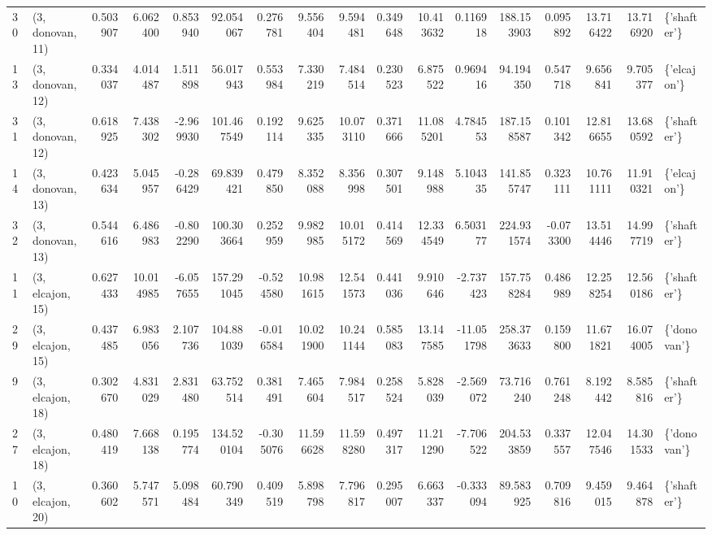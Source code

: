 \begin{tabular}{llrrrrrrrrrrrrrrl}
30 &  (3, donovan, 11) &   0.503907 &   6.062400 &  0.853940 &   92.054067 &  0.276781 &   9.556404 &   9.594481 &  0.349648 &  10.413632 &   0.116918 &  188.153903 &  0.095892 &  13.716422 &  13.716920 &  \{'shafter'\} \\
13 &  (3, donovan, 12) &   0.334037 &   4.014487 &  1.511898 &   56.017943 &  0.553984 &   7.330219 &   7.484514 &  0.230523 &   6.875522 &   0.969416 &   94.194350 &  0.547718 &   9.656841 &   9.705377 &  \{'elcajon'\} \\
31 &  (3, donovan, 12) &   0.618925 &   7.438302 & -2.969930 &  101.467549 &  0.192114 &   9.625335 &  10.073110 &  0.371666 &  11.085201 &   4.784553 &  187.158587 &  0.101342 &  12.816655 &  13.680592 &  \{'shafter'\} \\
14 &  (3, donovan, 13) &   0.423634 &   5.045957 & -0.286429 &   69.839421 &  0.479850 &   8.352088 &   8.356998 &  0.307501 &   9.148988 &   5.104335 &  141.855747 &  0.323111 &  10.761111 &  11.910321 &  \{'elcajon'\} \\
32 &  (3, donovan, 13) &   0.544616 &   6.486983 & -0.802290 &  100.303664 &  0.252959 &   9.982985 &  10.015172 &  0.414569 &  12.334549 &   6.503177 &  224.931574 & -0.073300 &  13.514446 &  14.997719 &  \{'shafter'\} \\
11 &  (3, elcajon, 15) &   0.627433 &  10.014985 & -6.057655 &  157.291045 & -0.524580 &  10.981615 &  12.541573 &  0.441036 &   9.910646 &  -2.737423 &  157.758284 &  0.486989 &  12.258254 &  12.560186 &  \{'shafter'\} \\
29 &  (3, elcajon, 15) &   0.437485 &   6.983056 &  2.107736 &  104.881039 & -0.016584 &  10.021900 &  10.241144 &  0.585083 &  13.147585 & -11.051798 &  258.373633 &  0.159800 &  11.671821 &  16.074005 &  \{'donovan'\} \\
9  &  (3, elcajon, 18) &   0.302670 &   4.831029 &  2.831480 &   63.752514 &  0.381491 &   7.465604 &   7.984517 &  0.258524 &   5.828039 &  -2.569072 &   73.716240 &  0.761248 &   8.192442 &   8.585816 &  \{'shafter'\} \\
27 &  (3, elcajon, 18) &   0.480419 &   7.668138 &  0.195774 &  134.520104 & -0.305076 &  11.596628 &  11.598280 &  0.497317 &  11.211290 &  -7.706522 &  204.533859 &  0.337557 &  12.047546 &  14.301533 &  \{'donovan'\} \\
10 &  (3, elcajon, 20) &   0.360602 &   5.747571 &  5.098484 &   60.790349 &  0.409519 &   5.898798 &   7.796817 &  0.295007 &   6.663337 &  -0.333094 &   89.583925 &  0.709816 &   9.459015 &   9.464878 &  \{'shafter'\} \\

\end{tabular}
